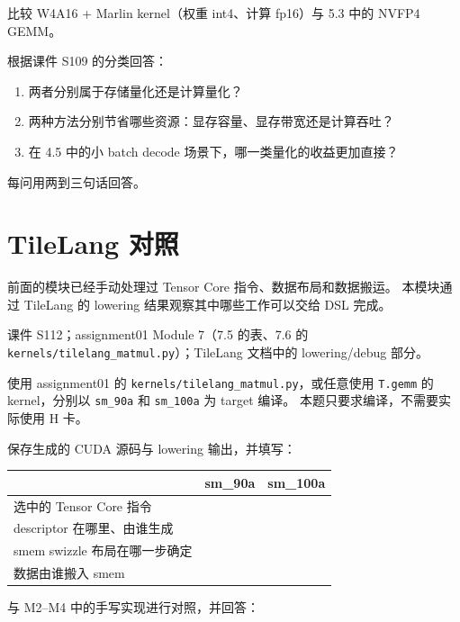 \documentclass[11pt,a4paper,fontset=fandol]{ctexart}
\begin{document}

比较 W4A16 + Marlin kernel（权重 int4、计算 fp16）与 5.3 中的 NVFP4
GEMM。

根据课件 S109 的分类回答：

\begin{enumerate}
\def\labelenumi{(\alph{enumi})}
\item
  两者分别属于存储量化还是计算量化？
\item
  两种方法分别节省哪些资源：显存容量、显存带宽还是计算吞吐？
\item
  在 4.5 中的小 batch decode 场景下，哪一类量化的收益更加直接？
\end{enumerate}

每问用两到三句话回答。

\section{TileLang 对照}\label{tilelang-ux5bf9ux7167}

前面的模块已经手动处理过 Tensor Core 指令、数据布局和数据搬运。
本模块通过 TileLang 的 lowering 结果观察其中哪些工作可以交给 DSL 完成。

\begin{reading}

课件 S112；assignment01 Module 7（7.5 的表、7.6 的
\texttt{kernels/tilelang\_matmul.py}）；TileLang 文档中的 lowering/debug
部分。

\end{reading}


使用 assignment01 的 \texttt{kernels/tilelang\_matmul.py}，或任意使用
\texttt{T.gemm} 的 kernel，分别以 \texttt{sm\_90a} 和 \texttt{sm\_100a}
为 target 编译。 本题只要求编译，不需要实际使用 H 卡。

保存生成的 CUDA 源码与 lowering 输出，并填写：

\begin{longtable}[]{@{}lll@{}}
\toprule\noalign{}
& sm\_90a & sm\_100a \\
\midrule\noalign{}
\endhead
\bottomrule\noalign{}
\endlastfoot
选中的 Tensor Core 指令 & & \\
descriptor 在哪里、由谁生成 & & \\
smem swizzle 布局在哪一步确定 & & \\
数据由谁搬入 smem & & \\
\end{longtable}

与 M2--M4 中的手写实现进行对照，并回答：
\end{document}

